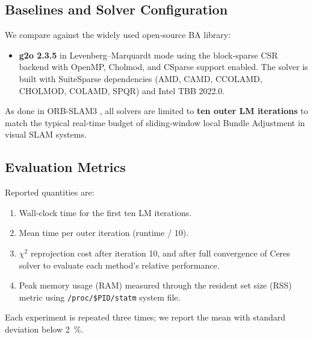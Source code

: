 \subsection{Baselines and Solver Configuration}
\label{subsec:exp_baselines}
We compare against the widely used open‑source BA library:
\begin{itemize}
\item \textbf{g2o 2.3.5} in Levenberg–Marquardt mode using the block‑sparse 
CSR backend with OpenMP, Cholmod, and CSparse support enabled. The solver is 
built with SuiteSparse dependencies (AMD, CAMD, CCOLAMD, CHOLMOD, COLAMD, SPQR) 
and Intel TBB 2022.0.
\end{itemize}
As done in ORB-SLAM3 \cite{campos2021orb}, all solvers are limited to \textbf{ten outer LM iterations} to match 
the typical real‑time budget of sliding‑window local Bundle Adjustment in visual SLAM systems.

\subsection{Evaluation Metrics}
\label{subsec:exp_metrics}
Reported quantities are:
\begin{enumerate}
\item Wall‑clock time for the first ten LM iterations.
\item Mean time per outer iteration (runtime / 10).
\item $\chi^{2}$ reprojection cost after iteration 10, and after full convergence of Ceres solver to evaluate each method's relative performance.
\item Peak memory usage (RAM) measured through the resident set size (RSS) metric using \texttt{/proc/\$PID/statm} system file.
\end{enumerate}
Each experiment is repeated three times; we report the mean with standard deviation below \SI{2}{\percent}.